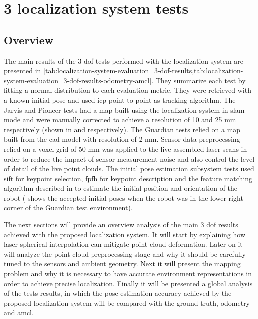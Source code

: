 \section{3  localization system tests}\label{sec:planar-localization-system-tests}


\subsection{Overview}

The main results of the 3 \gls{dof} tests performed with the localization system are presented in \cref{tab:localization-system-evaluation_3-dof-results,tab:localization-system-evaluation_3-dof-results-odometry-amcl}. They summarize each test by fitting a normal distribution to each evaluation metric. They were retrieved with a known initial pose and used \gls{icp} point-to-point as tracking algorithm. The Jarvis and Pioneer tests had a map built using the localization system in \gls{slam} mode and were manually corrected to achieve a resolution of 10 and 25 mm respectively (shown in  and  respectively). The Guardian tests relied on a map built from the \gls{cad} model with resolution of 2 mm. Sensor data preprocessing relied on a voxel grid of 50 mm was applied to the live assembled laser scans in order to reduce the impact of sensor measurement noise and also control the level of detail of the live point clouds. The initial pose estimation subsystem tests used \gls{sift} for keypoint selection, \gls{fpfh} for keypoint description and the feature matching algorithm described in  to estimate the initial position and orientation of the robot ( shows the accepted initial poses when the robot was in the lower right corner of the Guardian test environment).

The next sections will provide an overview analysis of the main 3 \gls{dof} results achieved with the proposed localization system. It will start by explaining how laser spherical interpolation can mitigate point cloud deformation. Later on it will analyze the point cloud preprocessing stage and why it should be carefully tuned to the sensors and ambient geometry. Next it will present the mapping problem and why it is necessary to have accurate environment representations in order to achieve precise localization. Finally it will be presented a global analysis of the tests results, in which the pose estimation accuracy achieved by the proposed localization system will be compared with the ground truth, odometry and \gls{amcl}.


